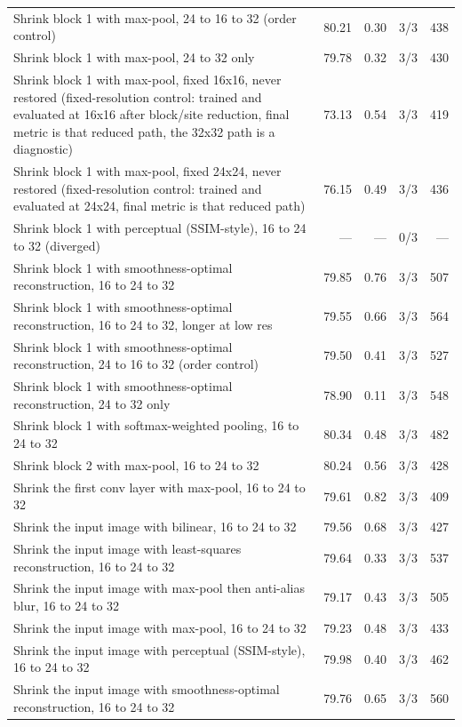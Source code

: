 \documentclass[10pt]{article}
\begin{document}
\begin{longtable}{@{}>{\raggedright\arraybackslash}p{9.2cm}rrcr@{}}
Shrink block 1 with max-pool, 24 to 16 to 32 (order control) & 80.21 & 0.30 & 3/3 & 438\\
Shrink block 1 with max-pool, 24 to 32 only & 79.78 & 0.32 & 3/3 & 430\\
Shrink block 1 with max-pool, fixed 16x16, never restored (fixed-resolution control: trained and evaluated at 16x16 after block/site reduction,  final metric is that reduced path, the 32x32 path is a diagnostic) & 73.13 & 0.54 & 3/3 & 419\\
Shrink block 1 with max-pool, fixed 24x24, never restored (fixed-resolution control: trained and evaluated at 24x24,  final metric is that reduced path) & 76.15 & 0.49 & 3/3 & 436\\
Shrink block 1 with perceptual (SSIM-style), 16 to 24 to 32 (diverged) & --- & --- & 0/3 & ---\\
Shrink block 1 with smoothness-optimal reconstruction, 16 to 24 to 32 & 79.85 & 0.76 & 3/3 & 507\\
Shrink block 1 with smoothness-optimal reconstruction, 16 to 24 to 32, longer at low res & 79.55 & 0.66 & 3/3 & 564\\
Shrink block 1 with smoothness-optimal reconstruction, 24 to 16 to 32 (order control) & 79.50 & 0.41 & 3/3 & 527\\
Shrink block 1 with smoothness-optimal reconstruction, 24 to 32 only & 78.90 & 0.11 & 3/3 & 548\\
Shrink block 1 with softmax-weighted pooling, 16 to 24 to 32 & 80.34 & 0.48 & 3/3 & 482\\
Shrink block 2 with max-pool, 16 to 24 to 32 & 80.24 & 0.56 & 3/3 & 428\\
Shrink the first conv layer with max-pool, 16 to 24 to 32 & 79.61 & 0.82 & 3/3 & 409\\
Shrink the input image with bilinear, 16 to 24 to 32 & 79.56 & 0.68 & 3/3 & 427\\
Shrink the input image with least-squares reconstruction, 16 to 24 to 32 & 79.64 & 0.33 & 3/3 & 537\\
Shrink the input image with max-pool then anti-alias blur, 16 to 24 to 32 & 79.17 & 0.43 & 3/3 & 505\\
Shrink the input image with max-pool, 16 to 24 to 32 & 79.23 & 0.48 & 3/3 & 433\\
Shrink the input image with perceptual (SSIM-style), 16 to 24 to 32 & 79.98 & 0.40 & 3/3 & 462\\
Shrink the input image with smoothness-optimal reconstruction, 16 to 24 to 32 & 79.76 & 0.65 & 3/3 & 560\\

\end{longtable}
\end{document}
